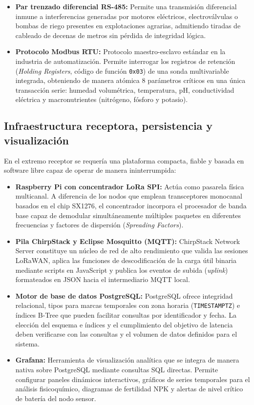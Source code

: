 \begin{itemize}
    \item \textbf{Par trenzado diferencial RS-485:} Permite una transmisión diferencial inmune a interferencias generadas por motores eléctricos, electroválvulas o bombas de riego presentes en explotaciones agrarias, admitiendo tiradas de cableado de decenas de metros sin pérdida de integridad lógica.
    \item \textbf{Protocolo Modbus RTU:} Protocolo maestro-esclavo estándar en la industria de automatización. Permite interrogar los registros de retención (\textit{Holding Registers}, código de función \texttt{0x03}) de una sonda multivariable integrada, obteniendo de manera atómica 8 parámetros críticos en una única transacción serie: humedad volumétrica, temperatura, pH, conductividad eléctrica y macronutrientes (nitrógeno, fósforo y potasio).
\end{itemize}

\subsection{Infraestructura receptora, persistencia y visualización}

En el extremo receptor se requería una plataforma compacta, fiable y basada en software libre capaz de operar de manera ininterrumpida:

\begin{itemize}
    \item \textbf{Raspberry Pi con concentrador LoRa SPI:} Actúa como pasarela física multicanal. A diferencia de los nodos que emplean transceptores monocanal basados en el chip SX1276, el concentrador incorpora el procesador de banda base capaz de demodular simultáneamente múltiples paquetes en diferentes frecuencias y factores de dispersión (\textit{Spreading Factors}).
    
    \item \textbf{Pila ChirpStack y Eclipse Mosquitto (MQTT):} ChirpStack Network Server constituye un núcleo de red de alto rendimiento que valida las sesiones LoRaWAN, aplica las funciones de descodificación de la carga útil binaria mediante scripts en JavaScript y publica los eventos de subida (\textit{uplink}) formateados en JSON hacia el intermediario MQTT local.

    \item \textbf{Motor de base de datos PostgreSQL:} PostgreSQL ofrece integridad relacional, tipos para marcas temporales con zona horaria (\texttt{TIMESTAMPTZ}) e índices B-Tree que pueden facilitar consultas por identificador y fecha. La elección del esquema e índices y el cumplimiento del objetivo de latencia deben verificarse con las consultas y el volumen de datos definidos para el sistema.

    \item \textbf{Grafana:} Herramienta de visualización analítica que se integra de manera nativa sobre PostgreSQL mediante consultas SQL directas. Permite configurar paneles dinámicos interactivos, gráficos de series temporales para el análisis fisicoquímico, diagramas de fertilidad NPK y alertas de nivel crítico de batería del nodo sensor.
\end{itemize}